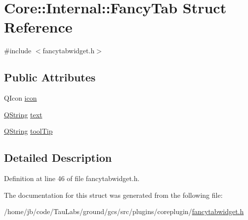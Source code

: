 \hypertarget{struct_core_1_1_internal_1_1_fancy_tab}{\section{\-Core\-:\-:\-Internal\-:\-:\-Fancy\-Tab \-Struct \-Reference}
\label{struct_core_1_1_internal_1_1_fancy_tab}
}


{\ttfamily \#include $<$fancytabwidget.\-h$>$}

\subsection*{\-Public \-Attributes}
\begin{DoxyCompactItemize}
\item 
\-Q\-Icon \hyperlink{group___core_plugin_gac279f1fc22813550a7b753d5c706bab6}{icon}
\item 
\hyperlink{group___u_a_v_objects_plugin_gab9d252f49c333c94a72f97ce3105a32d}{\-Q\-String} \hyperlink{group___core_plugin_ga69dfe64d44267cdfafa4682161bd6961}{text}
\item 
\hyperlink{group___u_a_v_objects_plugin_gab9d252f49c333c94a72f97ce3105a32d}{\-Q\-String} \hyperlink{group___core_plugin_gae38200de3f958b2986cadd6ec675fe07}{tool\-Tip}
\end{DoxyCompactItemize}


\subsection{\-Detailed \-Description}


\-Definition at line 46 of file fancytabwidget.\-h.



\-The documentation for this struct was generated from the following file\-:\begin{DoxyCompactItemize}
\item 
/home/jb/code/\-Tau\-Labs/ground/gcs/src/plugins/coreplugin/\hyperlink{coreplugin_2fancytabwidget_8h}{fancytabwidget.\-h}\end{DoxyCompactItemize}
